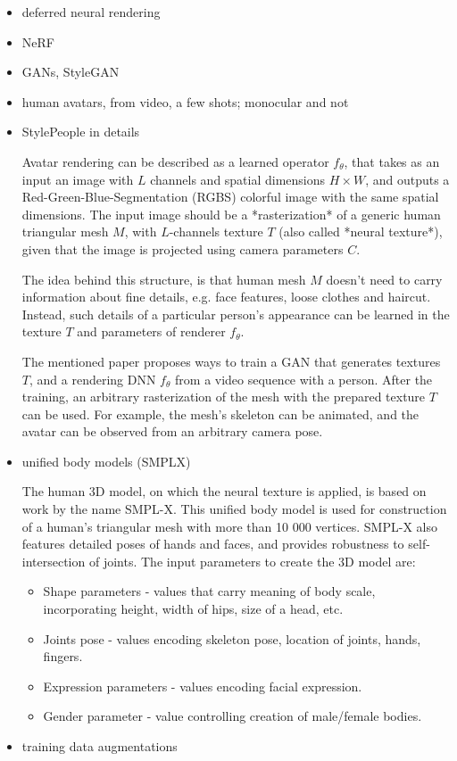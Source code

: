 \label{lit:nrender}
\begin{itemize}
	\item deferred neural rendering \cite{dnn:deferred19}
	\item NeRF \cite{dnn:nerf20,dnn:phorhum22}
	\item GANs, StyleGAN \cite{dnn:gan14, dnn:stylegan-v1-19,dnn:stylegan-v2-20,dnn:stylegan-v3-21,survey:gans:18}
	\item human avatars, from video, a few shots; monocular and not \cite{dnn:volumetric-primitives21}
	\item StylePeople in details \cite{dnn:stylepeople21}
	
	Avatar rendering can be described as a learned operator $f_\theta$, that takes as an input an image with $L$ channels and spatial dimensions $H \times W$, and outputs a Red-Green-Blue-Segmentation (RGBS) colorful image with the same spatial dimensions. The input image should be a *rasterization* of a generic human triangular mesh $M$, with $L$-channels texture $T$ (also called *neural texture*), given that the image is projected using camera parameters $C$. 
	
	The idea behind this structure, is that human mesh $M$ doesn't need to carry information about fine details, e.g. face features, loose clothes and haircut. Instead, such details of a particular person's appearance can be learned in the texture $T$ and parameters of renderer $f_\theta$. 
	
	The mentioned paper proposes ways to train a GAN that generates textures $T$, and a rendering DNN $f_\theta$ from a video sequence with a person. After the training, an arbitrary rasterization of the mesh with the prepared texture $T$ can be used. For example, the mesh's skeleton can be animated, and the avatar can be observed from an arbitrary camera pose. 
	
	\item unified body models (SMPLX) \cite{dnn:smpl15, dnn:smplify16, dnn:smplx19}
	
	The human 3D model, on which the neural texture is applied, is based on work by the name SMPL-X. This unified body model is used for construction of a human's triangular mesh with more than 10 000 vertices. SMPL-X also features detailed poses of hands and faces, and provides robustness to self-intersection of joints. The input parameters to create the 3D model are:
	\begin{itemize}
		\item  Shape parameters - values that carry meaning of body scale, incorporating height, width of hips, size of a head, etc.
		\item  Joints pose - values encoding skeleton pose, location of joints, hands, fingers.
		\item  Expression parameters - values encoding facial expression.
		\item  Gender parameter - value controlling creation of male/female bodies.
	\end{itemize}

	\item training data augmentations
	
\end{itemize}

